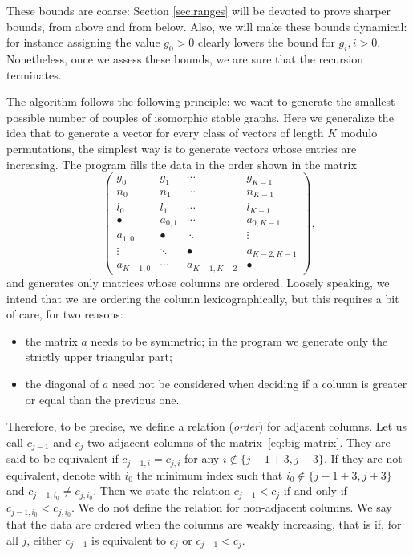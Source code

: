 \documentclass{amsart}
\theoremstyle{plain}
\theoremstyle{definition}
\begin{document}
These bounds are coarse: Section \ref{sec:ranges} will be devoted to
prove sharper bounds, from above and from below. Also, we will make
these bounds dynamical: for instance assigning the value $g_0 > 0$
clearly lowers the bound for $g_i, i > 0$. Nonetheless, once we assess
these bounds, we are sure that the recursion terminates.

The algorithm follows the following principle: we want to generate the
smallest possible number of couples of isomorphic stable graphs. Here
we generalize the idea that to generate a vector for every class of
vectors of length $K$ modulo permutations, the simplest way is to
generate vectors whose entries are increasing. The program fills the
data in the order shown in the matrix
\begin{equation}\label{eq:big matrix}
  \begin{pmatrix}
    g_0 & g_1 & \cdots & g_{K-1}\\
    n_0 & n_1 & \cdots & n_{K-1}\\
    l_0 & l_1 & \cdots & l_{K-1}\\
    \hline
    \bullet & a_{0,1} & \cdots & a_{0,K-1}\\
    a_{1,0} & \bullet & \ddots & \vdots\\
    \vdots & \ddots & \bullet & a_{K-2,K-1}\\
    a_{K-1,0} & \cdots & a_{K-1,K-2} & \bullet
  \end{pmatrix}\text{,}
\end{equation}
and generates only matrices whose columns are ordered. Loosely
speaking, we intend that we are ordering the column lexicographically,
but this requires a bit of care, for two reasons:
\begin{itemize}
\item the matrix $a$ needs to be symmetric; in the program we generate
  only the strictly upper triangular part;
\item the diagonal of $a$ need not be considered when deciding if a
  column is greater or equal than the previous one.
\end{itemize}

Therefore, to be precise, we define a relation (\emph{order}) for
adjacent columns. Let us call $c_{j-1}$ and $c_j$ two adjacent columns
of the matrix~\ref{eq:big matrix}. They are said to be equivalent if
$c_{j-1,i} = c_{j,i}$ for any $i \notin \{j-1+3, j+3\}$. If they are
not equivalent, denote with $i_0$ the minimum index such that $i_0
\notin \{ j-1+3, j+3\}$ and $c_{j-1,i_0} \neq c_{j,i_0}$. Then we
state the relation $c_{j-1} < c_j$ if and only if $c_{j-1,i_0} <
c_{j,i_0}$. We do not define the relation for non-adjacent columns.
We say that the data are ordered when the columns are weakly
increasing, that is if, for all $j$, either $c_{j-1}$ is equivalent to
$c_j$ or $c_{j-1} < c_j$.
\end{document}

